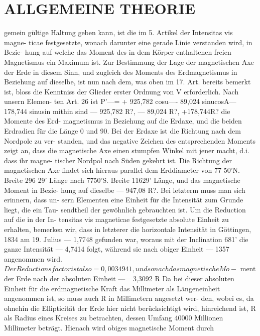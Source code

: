 \documentclass[12pt,a4paper]{article}
\begin{document}
\newpage


\section*{ALLGEMEINE THEORIE}
gemein gültige Haltung geben kann, ist die im 5. Artikel der Intensitas vis magne- ticae festgesetzte, wonach darunter eine gerade Linie verstanden wird, in Bezie- hung auf welche das Moment des in dem Körper enthaltenen freien Magnetismus ein Maximum ist. Zur Bestimmung der Lage der magnetischen Axe der Erde in diesem Sinn, und zugleich des Moments des Erdmagnetismus in Beziehung auf dieselbe, ist nun nach dem, was oben im 17. Art. bereits bemerkt ist, bloss die Kenntniss der Glieder erster Ordnung von V erforderlich. Nach unsern Elemen- ten Art. 26 ist P'---= + 925,782 cosu---- 89,024 sinucosA--- 178,744 sinusin mithin sind --- 925,782 R\textdegree{}?, --- 89,024 R?, +178,744R? die Momente des Erd- magnetismus in Beziehung auf die Erdaxe, und die beiden Erdradien für die Länge 0 und 90\textdegree{}. Bei der Erdaxe ist die Richtung nach dem Nordpole zu ver- standen, und das negative Zeichen des entsprechenden Moments zeigt an, dass die magnetische Axe einen stumpfen Winkel mit jener macht, d.i. dass ihr magne- tischer Nordpol nach Süden gekehrt ist. Die Richtung der magnetischen Axe findet sich hieraus parallel dem Erddiameter von 77\textdegree{} 50'N. Breite 296\textdegree{} 29' Länge nach 77\textdegree{}50'S. Breite 11629' Länge, und das magnetische Moment in Bezie- hung auf dieselbe --- 947,08 R?. Bei letzterm muss man sich erinnern, dass un- sern Elementen eine Einheit für die Intensität zum Grunde liegt, die ein Tau- sendtheil der gewöhnlich gebrauchten ist. Um die Reduction auf die in der In- tensitas vis magneticae festgesetzte absolute Einheit zu erhalten, bemerken wir, dass in letzterer die horizontale Intensität in Göttingen, 1834 am 19. Julius --- 1,7748 gefunden war, woraus mit der Inclination 68\textdegree{}1' die ganze Intensität --- 4,7414 folgt, während sie nach obiger Einheit --- 1357 angenommen wird.
$Der Reductionsfactor ist also = 0,0034941, und sonach das magnetische Mo-$
ment der Erde nach der absoluten Einheit ---= 3,3092 R\textdegree{} Da bei dieser absoluten Einheit für die erdmagnetische Kraft das Millimeter als Längeneinheit angenommen ist, so muss auch R in Millimetern angesetzt wer- den, wobei es, da ohnehin die Ellipticität der Erde hier nicht berücksichtigt wird, hinreichend ist, R als Radius eines Kreises zu betrachten, dessen Umfang 40000 Millionen Millimeter beträgt. Hienach wird obiges magnetische Moment durch
\end{document}
